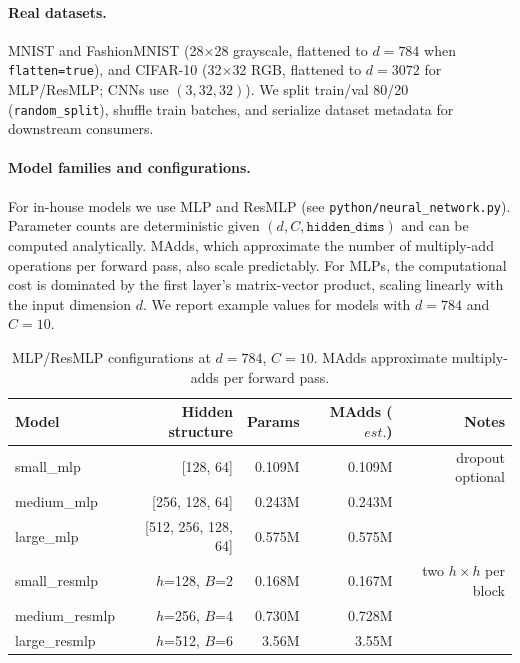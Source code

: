 \documentclass[11pt]{article}
\begin{document}
\paragraph{Real datasets.} MNIST and FashionMNIST (28$\times$28 grayscale, flattened to $d=784$ when \texttt{flatten=true}), and CIFAR-10 (32$\times$32 RGB, flattened to $d=3072$ for MLP/ResMLP; CNNs use $(3,32,32)$). We split train/val 80/20 (\texttt{random\_split}), shuffle train batches, and serialize dataset metadata for downstream consumers.

\paragraph{Model families and configurations.} For in-house models we use MLP and ResMLP (see \texttt{python/neural\_network.py}). Parameter counts are deterministic given $(d, C, \texttt{hidden\_dims})$ and can be computed analytically. MAdds, which approximate the number of multiply-add operations per forward pass, also scale predictably. For MLPs, the computational cost is dominated by the first layer's matrix-vector product, scaling linearly with the input dimension $d$. We report example values for models with $d=784$ and $C=10$.
\begin{table}[h!]
\centering
\caption{MLP/ResMLP configurations at $d=784$, $C=10$. MAdds approximate multiply-adds per forward pass.}
\begin{tabular}{@{}lrrrr@{}}
\toprule
Model & Hidden structure & Params & MAdds ($est.$) & Notes \\
\midrule
small\_mlp & [128, 64] & 0.109M & 0.109M & dropout optional \\
medium\_mlp & [256, 128, 64] & 0.243M & 0.243M &  \\
large\_mlp & [512, 256, 128, 64] & 0.575M & 0.575M &  \\
small\_resmlp & $h$=128, $B$=2 & 0.168M & 0.167M & two $h\times h$ per block \\
medium\_resmlp & $h$=256, $B$=4 & 0.730M & 0.728M &  \\
large\_resmlp & $h$=512, $B$=6 & 3.56M & 3.55M &  \\
\bottomrule
\end{tabular}
\end{table}
\end{document}
